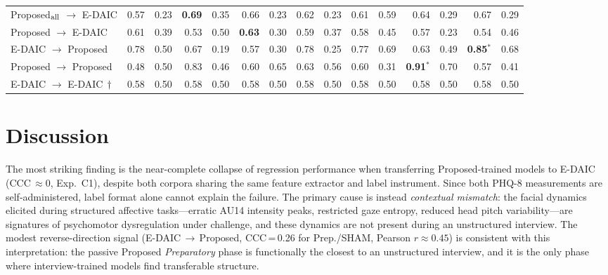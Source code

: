 \documentclass[sigconf]{acmart}
\begin{document}
\begin{table}[t]
{\begin{tabular}{l rr rr rr rr rr rr rr}
\midrule
Proposed$_{\rm all}$ $\to$ E-DAIC
  & 0.57 & 0.23 & \textbf{0.69} & 0.35 & 0.66 & 0.23
  & 0.62 & 0.23 & 0.61 & 0.59 & 0.64 & 0.29 & 0.67 & 0.29 \\
Proposed $\to$ E-DAIC
  & 0.61 & 0.39 & 0.53 & 0.50 & \textbf{0.63} & 0.30
  & 0.59 & 0.37 & 0.58 & 0.45 & 0.57 & 0.23 & 0.54 & 0.46 \\
E-DAIC $\to$ Proposed
  & 0.78 & 0.50 & 0.67 & 0.19 & 0.57 & 0.30
  & 0.78 & 0.25 & 0.77 & 0.69 & 0.63 & 0.49 & \textbf{0.85}$^*$ & 0.68 \\
Proposed $\to$ Proposed
  & 0.48 & 0.50 & 0.83 & 0.46 & 0.60 & 0.65
  & 0.63 & 0.56 & 0.60 & 0.31 & \textbf{0.91}$^*$ & 0.70 & 0.57 & 0.41 \\
E-DAIC $\to$ E-DAIC$\,\dagger$
  & 0.58 & 0.50 & 0.58 & 0.50 & 0.58 & 0.50
  & 0.58 & 0.50 & 0.58 & 0.50 & 0.58 & 0.50 & 0.58 & 0.50 \\
\bottomrule
\end{tabular}}
\end{table}

\section{Discussion}
\label{sec:discussion}

The most striking finding is the near-complete collapse of regression performance when
transferring Proposed-trained models to E-DAIC (CCC\,$\approx 0$, Exp.~C1),
despite both corpora sharing the same feature extractor and label instrument.
Since both PHQ-8 measurements are self-administered, label format alone cannot explain
the failure. The primary cause is instead \emph{contextual mismatch}: the facial dynamics
elicited during structured affective tasks---erratic AU14 intensity peaks, restricted
gaze entropy, reduced head pitch variability---are signatures of psychomotor dysregulation
under challenge, and these dynamics are not present during an unstructured interview.
The modest reverse-direction signal (E-DAIC\,$\to$\,Proposed, CCC\,=\,0.26 for Prep./SHAM,
Pearson $r \approx 0.45$) is consistent with this interpretation: the passive
Proposed \emph{Preparatory} phase is functionally the closest to an unstructured interview,
and it is the only phase where interview-trained models find transferable structure.
\end{document}

